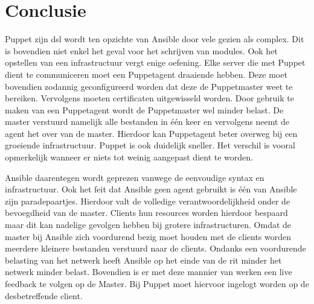 
\chapter{Conclusie}
\label{ch:conclusie}

 Puppet zijn \gls{dsl} wordt ten opzichte van Ansible door vele gezien als complex. Dit is bovendien niet enkel het geval voor het schrijven van modules. Ook het opstellen van een infrastructuur vergt enige oefening. Elke server die met Puppet dient te communiceren moet een Puppetagent draaiende hebben. Deze moet bovendien zodannig geconfigureerd worden dat deze de Puppetmaster weet te bereiken. Vervolgens moeten certificaten uitgewisseld worden. Door gebruik te maken van een Puppetagent wordt de Puppetmaster wel minder belast. De master verstuurd namelijk alle bestanden in \'e\'en keer en vervolgens neemt de agent het over van de master. Hierdoor kan Puppetagent beter overweg bij een groeiende infrastructuur. Puppet is ook duidelijk sneller. Het verschil is vooral opmerkelijk wanneer er niets tot weinig aangepast dient te worden. 

Ansible daarentegen wordt geprezen vanwege de eenvoudige syntax en infrastructuur. Ook het feit dat Ansible geen agent gebruikt is \'e\'en van Ansible zijn paradepaartjes. Hierdoor valt de volledige verantwoordelijkheid onder de bevoegdheid van de master. Clients hun resources worden hierdoor bespaard maar dit kan nadelige gevolgen hebben bij grotere infrastructuren. Omdat de master bij Ansible zich voordurend bezig moet houden met de clients worden meerdere kleinere bestanden verstuurd naar de clients. Ondanks een voordurende belasting van het netwerk heeft Ansible op het einde van de rit minder het netwerk minder belast. Bovendien is er met deze mannier van werken een live feedback te volgen op de Master. Bij Puppet moet hiervoor ingelogt worden op de desbetreffende client.




